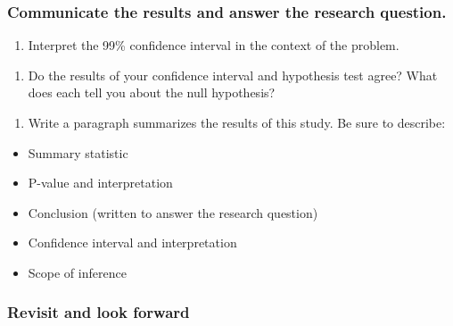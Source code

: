 \documentclass[
]{report}
\providecommand{\tightlist}{%
  \setlength{\itemsep}{0pt}\setlength{\parskip}{0pt}}
\begin{document}
\vspace{.3in}

\hypertarget{communicate-the-results-and-answer-the-research-question.}{%
\subsubsection*{Communicate the results and answer the research question.}\label{communicate-the-results-and-answer-the-research-question.}}

\begin{enumerate}
\def\labelenumi{\arabic{enumi}.}
\setcounter{enumi}{20}
\tightlist
\item
  Interpret the 99\% confidence interval in the context of the problem.
\end{enumerate}

\vspace{.8in}

\begin{enumerate}
\def\labelenumi{\arabic{enumi}.}
\setcounter{enumi}{21}
\tightlist
\item
  Do the results of your confidence interval and hypothesis test agree? What does each tell you about the null hypothesis?
\end{enumerate}

\vspace{.7in}

\begin{enumerate}
\def\labelenumi{\arabic{enumi}.}
\setcounter{enumi}{22}
\tightlist
\item
  Write a paragraph summarizes the results of this study. Be sure to describe:
\end{enumerate}

\begin{itemize}
\item
  Summary statistic
\item
  P-value and interpretation
\item
  Conclusion (written to answer the research question)
\item
  Confidence interval and interpretation
\item
  Scope of inference
\end{itemize}

\vspace{3in}

\hypertarget{revisit-and-look-forward-2}{%
\subsubsection*{Revisit and look forward}\label{revisit-and-look-forward-2}}
\end{document}
